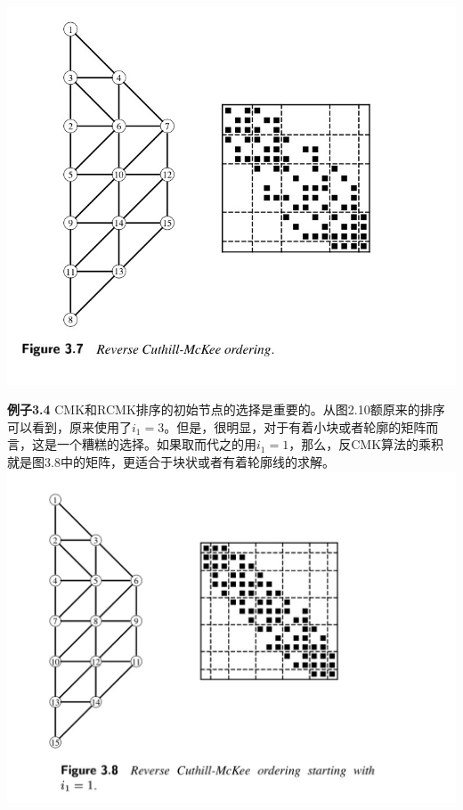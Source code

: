 \documentclass{article}
\begin{document}
\newline\newline\newline\newline\newline\newline\newline\newline
\includegraphics[scale=0.25]{3_7.png}

\textbf{例子3.4}
CMK和RCMK排序的初始节点的选择是重要的。从图2.10额原来的排序可以看到，原来使用了$i_1=3$。但是，很明显，对于有着小块或者轮廓的矩阵而言，这是一个糟糕的选择。如果取而代之的用$i_1=1$，那么，反CMK算法的乘积就是图3.8中的矩阵，更适合于块状或者有着轮廓线的求解。
\newline\newline\newline\newline\newline\newline\newline\newline\newline\newline
\includegraphics[scale=0.25]{3_8.png}
\end{document}
